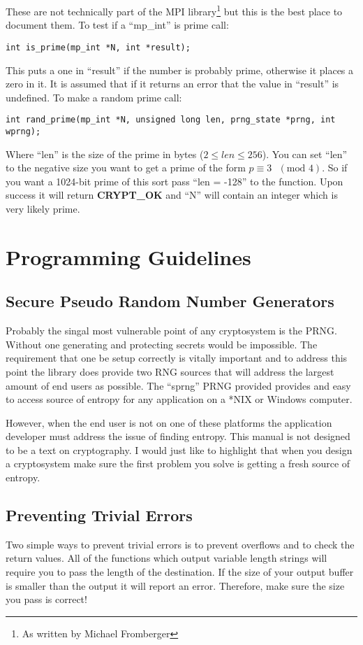 \documentclass{book}
\begin{document}
These are not technically part of the MPI
library\footnote{As written by Michael Fromberger} but this is the best place to document them.  To test if a ``mp\_int'' is
prime call:
\begin{verbatim}
int is_prime(mp_int *N, int *result);
\end{verbatim}
This puts a one in ``result'' if the number is probably prime, otherwise it places a zero in it.  It is assumed that if 
it returns an error that the value in ``result'' is undefined.  To make 
a random prime call:
\begin{verbatim}
int rand_prime(mp_int *N, unsigned long len, prng_state *prng, int wprng);
\end{verbatim}
Where ``len'' is the size of the prime in bytes ($2 \le len \le 256$).  You can set ``len'' to the negative size you want
to get a prime of the form $p \equiv 3\mbox{ }(\mbox{mod } 4)$.  So if you want a 1024-bit prime of this sort pass 
``len = -128'' to the function.  Upon success it will return {\bf CRYPT\_OK} and ``N'' will contain an integer which
is very likely prime.

\chapter{Programming Guidelines}

\section{Secure Pseudo Random Number Generators}
Probably the singal most vulnerable point of any cryptosystem is the PRNG.  Without one generating and protecting secrets
would be impossible.  The requirement that one be setup correctly is vitally important and to address this point the library
does provide two RNG sources that will address the largest amount of end users as possible.  The ``sprng'' PRNG provided 
provides and easy to access source of entropy for any application on a *NIX or Windows computer.  

However, when the end user is not on one of these platforms the application developer must address the issue of finding
entropy.  This manual is not designed to be a text on cryptography.  I would just like to highlight that when you design
a cryptosystem make sure the first problem you solve is getting a fresh source of entropy.  

\section{Preventing Trivial Errors}
Two simple ways to prevent trivial errors is to prevent overflows and to check the return values.  All of the functions
which output variable length strings will require you to pass the length of the destination.  If the size of your output
buffer is smaller than the output it will report an error.  Therefore, make sure the size you pass is correct!
\end{document}
